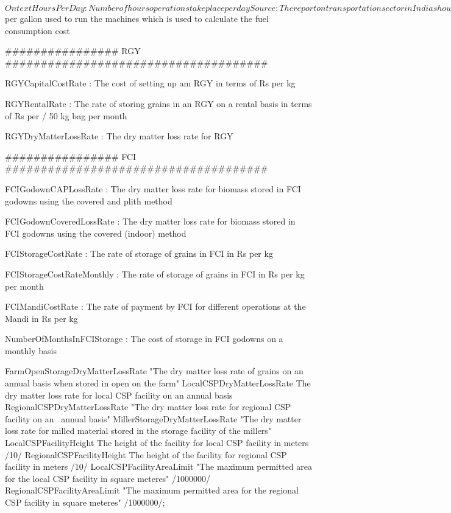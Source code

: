 $Ontext
HoursPerDay : Number of hours operations take place per day
  Source: The report on transportation sector in India shows that the working hours for truck 
  operators range from 8-14 hours. So 10 hours is a reasonable assumption on a average

DieselFuelCost : The cost of diesel in $ per gallon used to run the machines which is used to
  calculate the fuel consumption cost

################  RGY   #####################################

RGYCapitalCostRate : The cost of setting up am RGY in terms of Rs per kg

RGYRentalRate : The rate of storing grains in an RGY on a rental basis in terms of Rs per /
  50 kg bag per month

RGYDryMatterLossRate : The dry matter loss rate for RGY

################  FCI   #####################################

FCIGodownCAPLossRate :  The dry matter loss rate for biomass stored in FCI godowns
  using the covered and plith method

FCIGodownCoveredLossRate :  The dry matter loss rate for biomass stored in FCI godowns using
  the covered (indoor) method

FCIStorageCostRate : The rate of storage of grains in FCI in Rs per kg

FCIStorageCostRateMonthly : The rate of storage of grains in FCI in Rs per kg per month

FCIMandiCostRate : The rate of payment by FCI for different operations at the Mandi in Rs per kg

NumberOfMonthsInFCIStorage : The cost of storage in FCI godowns on a monthly basis

FarmOpenStorageDryMatterLossRate "The dry matter loss rate of grains on an annual basis when
   stored in open on the farm"
  LocalCSPDryMatterLossRate The dry matter loss rate for local CSP facility on an annual basis
  RegionalCSPDryMatterLossRate "The dry matter loss rate for regional CSP facility on an \
    annual basis"
  MillerStorageDryMatterLossRate "The dry matter loss rate for milled material stored in the 
    storage facility of the millers"
  LocalCSPFacilityHeight The height of the facility for local CSP facility in meters /10/
  RegionalCSPFacilityHeight The height of the facility for regional CSP facility in meters /10/
  LocalCSPFacilityAreaLimit "The maximum permitted area for the local CSP facility in square
    meteres" /1000000/
  RegionalCSPFacilityAreaLimit "The maximum permitted area for the regional CSP facility in square
    meteres" /1000000/;

